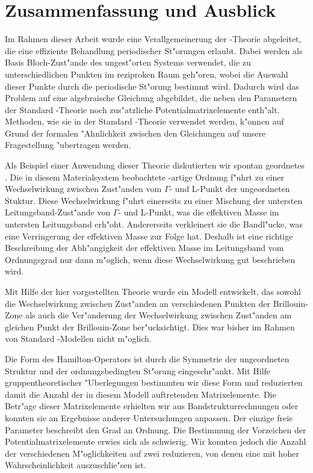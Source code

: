 

\chapter{Zusammenfassung und Ausblick}
\label{cha:zusamm}

Im Rahmen dieser Arbeit wurde eine Verallgemeinerung der \kdotp-Theorie
abgeleitet, die eine effiziente Behandlung periodischer St"orungen erlaubt.
Dabei werden als Basis Bloch-Zust"ande des ungest"orten Systems verwendet, die
zu unterschiedlichen Punkten im reziproken Raum geh"oren, wobei die Auswahl
dieser Punkte durch die periodische St"orung bestimmt wird. Dadurch wird das
Problem auf eine algebraische Gleichung abgebildet, die neben den Parametern
der Standard \kdotp-Theorie noch zus"atzliche Potentialmatrixelemente
enth"alt.  Methoden, wie sie in der Standard \kdotp-Theorie verwendet werden,
k"onnen auf Grund der formalen "Ahnlichkeit zwischen den Gleichungen auf
unsere Fragestellung "ubertragen werden.

Als Beispiel einer Anwendung dieser Theorie diskutierten wir spontan geordnetes
\GaInP. Die in diesem Materialsystem beobachtete \CuPt-artige Ordnung f"uhrt
zu einer Wechselwirkung zwischen Zust"anden vom $\Gamma$- und L-Punkt der
ungeordneten Stuktur. Diese Wechselwirkung f"uhrt einerseits zu einer Mischung
der untersten Leitungsband-Zust"ande von $\Gamma$- und L-Punkt, was die
effektiven Masse im untersten Leitungsband erh"oht. Andererseits verkleinert
sie die Bandl"ucke, was eine Verringerung der effektiven Masse zur Folge hat.
Deshalb ist eine richtige Beschreibung der Abh"angigkeit der effektiven Masse
im Leitungsband vom Ordnungsgrad nur dann m"oglich, wenn diese Wechselwirkung
gut beschrieben wird.

Mit Hilfe der hier vorgestellten Theorie wurde ein Modell  entwickelt,
das sowohl die Wechselwirkung zwischen Zust"anden an verschiedenen Punkten der
Brillouin-Zone als auch die Ver"anderung der Wechselwirkung zwischen
Zust"anden am gleichen Punkt der Brillouin-Zone ber"ucksichtigt. Dies war
bisher im Rahmen von Standard \kdotp-Modellen nicht m"oglich. 

Die Form des Hamilton-Operators ist durch die Symmetrie der ungeordneten
Struktur und der ordnungsbedingten St"orung eingeschr"ankt. Mit Hilfe
gruppentheoretischer "Uberlegungen bestimmten wir diese Form und reduzierten
damit die Anzahl der in diesem Modell auftretenden Matrixelemente. Die
Betr"age dieser Matrixelemente erhielten wir aus Bandstrukturrechnungen oder
konnten sie an Ergebnisse anderer Untersuchungen anpassen. Der einzige freie
Parameter beschreibt den Grad an Ordnung. Die Bestimmung der Vorzeichen der
Potentialmatrixelemente erwies sich als schwierig. Wir konnten jedoch die
Anzahl der verschiedenen M"oglichkeiten auf zwei reduzieren, von denen eine
mit hoher Wahrscheinlichkeit auszuschlie"sen ist.

